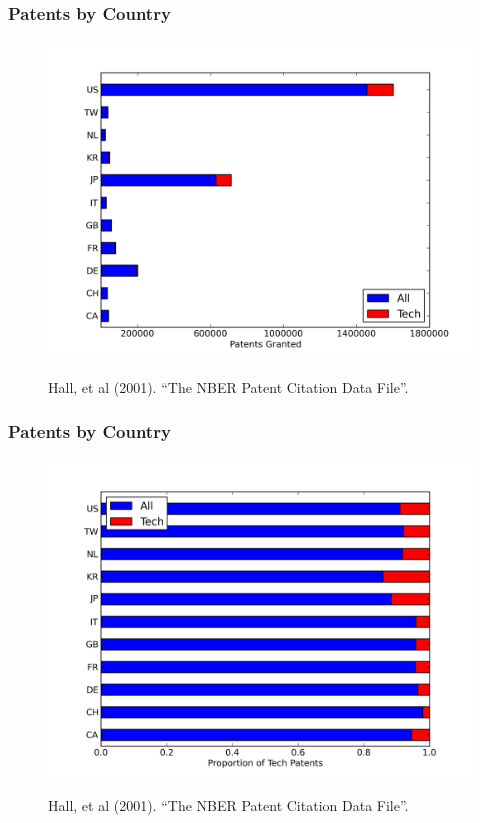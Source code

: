 \documentclass{beamer}
\begin{document}
\begin{frame}[t]\frametitle{Patents by Country} 
\fontsize{6pt}{7.2}\selectfont
\!\!\!\!\!\!\!\!\!\!\!\!\!
\begin{figure}[hb]
  \begin{center}
    \includegraphics[scale=.5]{by_country.png}
    \label{fig:by_country}
  \end{center}
  \!\!\!\!\!
  Hall, et al (2001). ``The NBER Patent Citation Data File''.  
\end{figure}
\end{frame}

\begin{frame}[t]\frametitle{Patents by Country} 
\fontsize{6pt}{7.2}\selectfont
\!\!\!\!\!\!\!\!\!\!\!\!\!
\begin{figure}[T]
  \begin{center}
    \includegraphics[scale=.5]{by_country_normalized.png}
    \label{fig:by_country_normalized}
  \end{center}
  \!\!\!\!\!
  Hall, et al (2001). ``The NBER Patent Citation Data File''.

\end{figure}
\end{frame}
\end{document}
